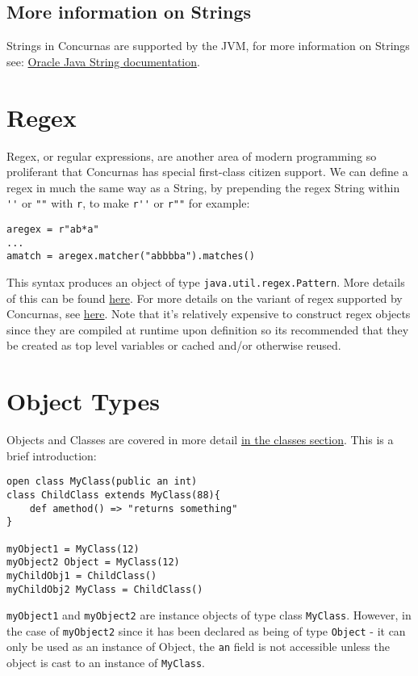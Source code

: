 \documentclass[conc-doc]{subfiles}
\begin{document}
\subsection{More information on Strings}
Strings in Concurnas are supported by the JVM, for more information on Strings see: \href{https://docs.oracle.com/javase/tutorial/java/data/strings.html}{Oracle Java String documentation}.

\section{Regex}
Regex, or regular expressions, are another area of modern programming so proliferant that Concurnas has special first-class citizen support. We can define a regex in much the same way as a String, by prepending the regex String within \lstinline{''} or \lstinline{""} with \lstinline{r}, to make \lstinline{r''} or \lstinline{r""} for example:
\begin{lstlisting}
aregex = r"ab*a"
...
amatch = aregex.matcher("abbbba").matches()
\end{lstlisting}

This syntax produces an object of type \lstinline{java.util.regex.Pattern}. More details of this can be found \href{https://docs.oracle.com/en/java/javase/12/docs/api/java.base/java/util/regex/Pattern.html}{here}. For more details on the variant of regex supported by Concurnas, see \href{https://docs.oracle.com/en/java/javase/12/docs/api/java.base/java/util/regex/Pattern.html}{here}. Note that it's relatively expensive to construct regex objects since they are compiled at runtime upon definition so its recommended that they be created as top level variables or cached and/or otherwise reused.

\section{Object Types}
Objects and Classes are covered in more detail \hyperref[ss:samTypes]{in the classes section}. This is a brief introduction:

\begin{lstlisting}
open class MyClass(public an int)
class ChildClass extends MyClass(88){
	def amethod() => "returns something"
}

myObject1 = MyClass(12)
myObject2 Object = MyClass(12)
myChildObj1 = ChildClass()
myChildObj2 MyClass = ChildClass()
\end{lstlisting}

\lstinline{myObject1} and \lstinline{myObject2} are instance objects of type class \lstinline{MyClass}. However, in the case of \lstinline{myObject2} since it has been declared as being of type \lstinline{Object} - it can only be used as an instance of Object, the \lstinline{an} field is not accessible unless the object is cast to an instance of \lstinline{MyClass}.
\end{document}
